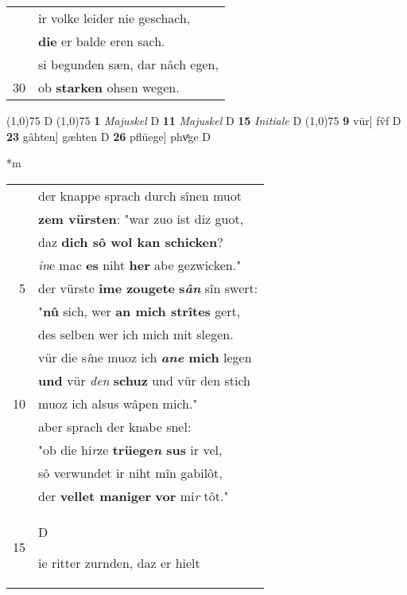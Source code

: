 \documentclass[8pt,a4paper,notitlepage]{article}
\begin{document}
\begin{table}[ht]
\begin{minipage}[t]{0.5\linewidth}
\begin{tabular}{rl}
 & ir volke leider nie geschach,\\ 
 & \textbf{die} er balde eren sach.\\ 
 & si begunden sæn, dar nâch egen,\\ 
30 & ob \textbf{starken} ohsen wegen.\\ 
\end{tabular}
\scriptsize
\line(1,0){75} \newline
D \newline
\line(1,0){75} \newline
\textbf{1} \textit{Majuskel} D  \textbf{11} \textit{Majuskel} D  \textbf{15} \textit{Initiale} D  \newline
\line(1,0){75} \newline
\textbf{9} vür] fv̂f D \textbf{23} gâhten] gæhten D \textbf{26} pflüege] phvͤge D \newline
\end{minipage}
\hspace{0.5cm}
\begin{minipage}[t]{0.5\linewidth}
\small
\begin{center}*m
\end{center}
\begin{tabular}{rl}
 & der knappe sprach durch sînen muot\\ 
 & \textbf{zem vürsten}: "war zuo ist diz guot,\\ 
 & daz \textbf{dich sô wol kan schicken}?\\ 
 & \textit{in}e mac \textbf{es} niht \textbf{her} abe gezwicken."\\ 
5 & der vürste \textbf{ime zougete} \textbf{s\textit{ân}} sîn swert:\\ 
 & "\textbf{nû} sich, wer \textbf{an mich strîtes} gert,\\ 
 & des selben wer ich mich mit slegen.\\ 
 & vür die s\textit{î}ne muoz ich \textbf{\textit{ane} mich} legen\\ 
 & \textbf{und} vür \textit{den} \textbf{schuz} und vür den stich\\ 
10 & muoz ich alsus wâpen mich."\\ 
 & aber sprach der knabe snel:\\ 
 & "ob die hi\textit{r}ze \textbf{trüege\textit{n} sus} ir vel,\\ 
 & sô verwundet ir niht mîn gabilôt,\\ 
 & der \textbf{vellet maniger} \textbf{vor} mi\textit{r} tôt."\\ 
15 & \begin{large}D\end{large}ie ritter zurnden, daz er hielt\\ 

\end{tabular}
\end{minipage}
\end{table}
\end{document}
